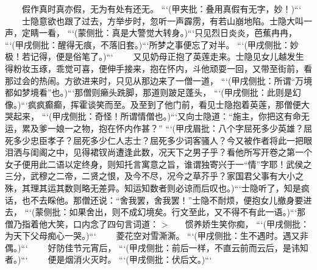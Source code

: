 \documentclass[
    ref = refDemo.bib,
    coverpage = cover.pdf,
    geometry = b5,
    lang = cn
]{spBook}
\begin{document}
    　　假作真时真亦假，无为有处有还无。 ```(甲夹批：叠用真假有无字，妙！)```  
    　　士隐意欲也跟了过去，方举步时，忽听一声霹雳，有若山崩地陷。士隐大叫一声，定睛一看， ```(蒙侧批：真是大警觉大转身。)```只见烈日炎炎，芭蕉冉冉， ```(甲戌侧批：醒得无痕，不落旧套。)```所梦之事便忘了对半。 ```(甲戌侧批：妙极！若记得，便是俗笔了。)```  
    　　又见奶母正抱了英莲走来。士隐见女儿越发生得粉妆玉琢，乖觉可喜，便伸手接来，抱在怀内，斗他顽耍一回，又带至街前，看那过会的热闹。方欲进来时，只见从那边来了一僧一道， ```(甲戌侧批：所谓“万境都如梦境看”也。)```那僧则癞头跣脚，那道则跛足蓬头， ```(甲戌侧批：此则是幻像。)```疯疯癫癫，挥霍谈笑而至。及至到了他门前，看见士隐抱着英莲，那僧便大哭起来， ```(甲戌侧批：奇怪！所谓情僧也。)```又向士隐道：“施主，你把这有命无运，累及爹一娘一之物，抱在怀内作甚？” ```(甲戌眉批：八个字屈死多少英雄？屈死多少忠臣孝子？屈死多少仁人志士？屈死多少词客骚人？今又被作者将此一把眼泪洒与闺阁之中，见得裙钗尚遭逢此数，况天下之男子乎？看他所写开卷之第一个女子便用此二语以定终身，则知托言寓意之旨，谁谓独寄兴于一“情”字耶！武侯之三分，武穆之二帝，二贤之恨，及今不尽，况今之草芥乎？家国君父事有大小之殊，其理其运其数则略无差异。知运知数者则必谅而后叹也。)```士隐听了，知是疯话，也不去睬他。那僧还说：“舍我罢，舍我罢！”士隐不耐烦，便抱女儿撤身要进去， ```(蒙侧批：如果舍出，则不成幻境矣。行文至此，又不得不有此一语。)```那僧乃指着他大笑，口内念了四句言词道：  
    >　　惯养娇生笑你痴， ```(甲戌侧批：为天下父母痴心一哭。)```  
    　　菱花空对雪澌澌。 ```(甲戌侧批：生不遇时。遇又非偶。)```  
    　　好防佳节元宵后， ```(甲戌侧批：前后一样，不直云前而云后，是讳知者。)```  
    　　便是烟消火灭时。 ```(甲戌侧批：伏后文。)```  
\end{document}
